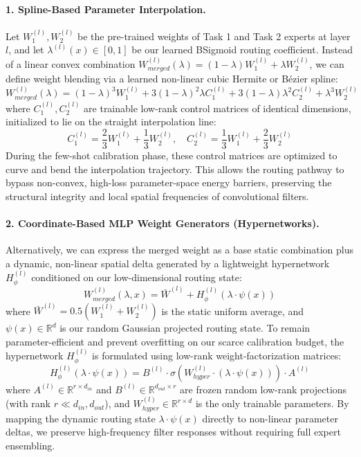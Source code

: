 \paragraph{1. Spline-Based Parameter Interpolation.}
Let $W_1^{(l)}, W_2^{(l)}$ be the pre-trained weights of Task 1 and Task 2 experts at layer $l$, and let $\lambda^{(l)}(x) \in [0, 1]$ be our learned BSigmoid routing coefficient. Instead of a linear convex combination $W_{merged}^{(l)}(\lambda) = (1 - \lambda) W_1^{(l)} + \lambda W_2^{(l)}$, we can define weight blending via a learned non-linear cubic Hermite or B\'ezier spline:
\begin{equation}
    W_{merged}^{(l)}(\lambda) = (1 - \lambda)^3 W_1^{(l)} + 3(1-\lambda)^2 \lambda C_1^{(l)} + 3(1-\lambda)\lambda^2 C_2^{(l)} + \lambda^3 W_2^{(l)}
\end{equation}
where $C_1^{(l)}, C_2^{(l)}$ are trainable low-rank control matrices of identical dimensions, initialized to lie on the straight interpolation line:
\begin{equation}
    C_1^{(l)} = \frac{2}{3}W_1^{(l)} + \frac{1}{3}W_2^{(l)}, \quad C_2^{(l)} = \frac{1}{3}W_1^{(l)} + \frac{2}{3}W_2^{(l)}
\end{equation}
During the few-shot calibration phase, these control matrices are optimized to curve and bend the interpolation trajectory. This allows the routing pathway to bypass non-convex, high-loss parameter-space energy barriers, preserving the structural integrity and local spatial frequencies of convolutional filters.

\paragraph{2. Coordinate-Based MLP Weight Generators (Hypernetworks).}
Alternatively, we can express the merged weight as a base static combination plus a dynamic, non-linear spatial delta generated by a lightweight hypernetwork $H_\phi^{(l)}$ conditioned on our low-dimensional routing state:
\begin{equation}
    W_{merged}^{(l)}(\lambda, x) = \bar{W}^{(l)} + H_\phi^{(l)}(\lambda \cdot \psi(x))
\end{equation}
where $\bar{W}^{(l)} = 0.5(W_1^{(l)} + W_2^{(l)})$ is the static uniform average, and $\psi(x) \in \mathbb{R}^d$ is our random Gaussian projected routing state. To remain parameter-efficient and prevent overfitting on our scarce calibration budget, the hypernetwork $H_\phi^{(l)}$ is formulated using low-rank weight-factorization matrices:
\begin{equation}
    H_\phi^{(l)}(\lambda \cdot \psi(x)) = B^{(l)} \cdot \sigma\left(W_{hyper}^{(l)} \cdot (\lambda \cdot \psi(x))\right) \cdot A^{(l)}
\end{equation}
where $A^{(l)} \in \mathbb{R}^{r \times d_{in}}$ and $B^{(l)} \in \mathbb{R}^{d_{out} \times r}$ are frozen random low-rank projections (with rank $r \ll d_{in}, d_{out}$), and $W_{hyper}^{(l)} \in \mathbb{R}^{r \times d}$ is the only trainable parameters. By mapping the dynamic routing state $\lambda \cdot \psi(x)$ directly to non-linear parameter deltas, we preserve high-frequency filter responses without requiring full expert ensembling.


